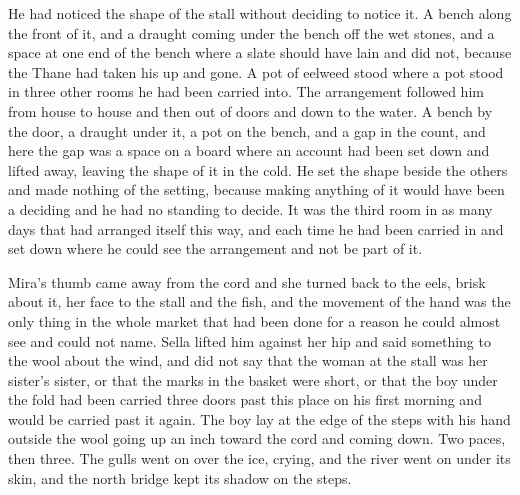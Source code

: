 He had noticed the shape of the stall without deciding to notice it. A bench along the front of it, and a draught coming under the bench off the wet stones, and a space at one end of the bench where a slate should have lain and did not, because the Thane had taken his up and gone. A pot of eelweed stood where a pot stood in three other rooms he had been carried into. The arrangement followed him from house to house and then out of doors and down to the water. A bench by the door, a draught under it, a pot on the bench, and a gap in the count, and here the gap was a space on a board where an account had been set down and lifted away, leaving the shape of it in the cold. He set the shape beside the others and made nothing of the setting, because making anything of it would have been a deciding and he had no standing to decide. It was the third room in as many days that had arranged itself this way, and each time he had been carried in and set down where he could see the arrangement and not be part of it.

Mira's thumb came away from the cord and she turned back to the eels, brisk about it, her face to the stall and the fish, and the movement of the hand was the only thing in the whole market that had been done for a reason he could almost see and could not name. Sella lifted him against her hip and said something to the wool about the wind, and did not say that the woman at the stall was her sister's sister, or that the marks in the basket were short, or that the boy under the fold had been carried three doors past this place on his first morning and would be carried past it again. The boy lay at the edge of the steps with his hand outside the wool going up an inch toward the cord and coming down. Two paces, then three. The gulls went on over the ice, crying, and the river went on under its skin, and the north bridge kept its shadow on the steps.
